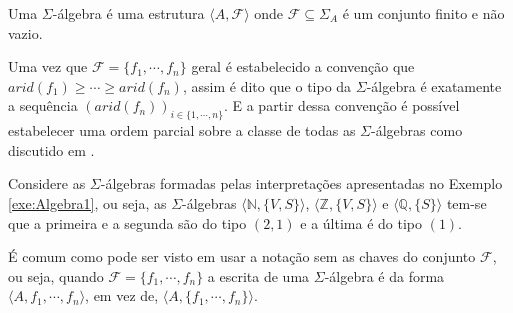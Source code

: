 \begin{definicao}\label{def:SigmaAlgebra}
  Uma $\Sigma$-álgebra é uma estrutura $\langle A, \mathcal{F} \rangle$ onde $\mathcal{F} \subseteq \Sigma_A$ é um conjunto finito e não vazio.
\end{definicao}

Uma vez que $\mathcal{F} = \{f_1, \cdots, f_n\}$ geral é estabelecido a convenção que $arid(f_1) \geq \cdots \geq arid(f_n)$, assim é dito que o tipo da $\Sigma$-álgebra é exatamente a sequência $(arid(f_n))_{i \in \{1, \cdots, n\}}$. E a partir dessa convenção é possível estabelecer uma ordem parcial sobre a classe de todas as $\Sigma$-álgebras como discutido em \cite{denecke2018}.

\begin{exemplo}
  Considere as $\Sigma$-álgebras formadas pelas interpretações apresentadas no Exemplo \ref{exe:Algebra1}, ou seja, as $\Sigma$-álgebras $\langle \mathbb{N}, \{V, S\} \rangle$, $\langle \mathbb{Z}, \{V, S\} \rangle$ e $\langle \mathbb{Q}, \{S\} \rangle$ tem-se que a primeira e a segunda são do tipo $(2, 1)$ e a última é do tipo $(1)$.
\end{exemplo}

\begin{atencao}
  É comum como pode ser visto em \cite{burris1981, denecke2018, carmo2013} usar a notação sem as chaves do conjunto $\mathcal{F}$, ou seja, quando $\mathcal{F} = \{f_1, \cdots, f_n\}$ a escrita de uma $\Sigma$-álgebra é da forma $\langle A, f_1, \cdots, f_n \rangle$, em vez de, $\langle A, \{f_1, \cdots, f_n\} \rangle$.
\end{atencao}

